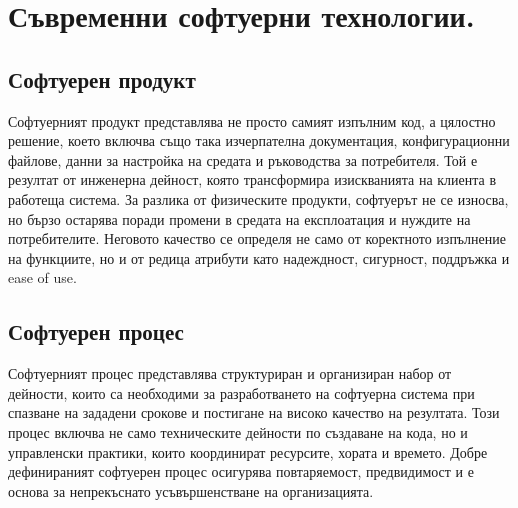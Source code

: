 \documentclass{article}
\renewcommand{\\}{\newline}
\begin{document}
\begin{center}
\end{center}
\newpage
\section{Съвременни софтуерни технологии.}
\subsection{Софтуерен продукт}
Софтуерният продукт представлява не просто самият изпълним код, а цялостно решение, което включва също така изчерпателна документация, конфигурационни файлове, данни за настройка на средата и ръководства за потребителя. Той е резултат от инженерна дейност, която трансформира изискванията на клиента в работеща система. За разлика от физическите продукти, софтуерът не се износва, но бързо остарява поради промени в средата на експлоатация и нуждите на потребителите. Неговото качество се определя не само от коректното изпълнение на функциите, но и от редица атрибути като надеждност, сигурност, поддръжка и ease of use.

\subsection{Софтуерен процес}
Софтуерният процес представлява структуриран и организиран набор от дейности, които са необходими за разработването на софтуерна система при спазване на зададени срокове и постигане на високо качество на резултата. Този процес включва не само техническите дейности по създаване на кода, но и управленски практики, които координират ресурсите, хората и времето. Добре дефинираният софтуерен процес осигурява повтаряемост, предвидимост и е основа за непрекъснато усъвършенстване на организацията.
\end{document}
